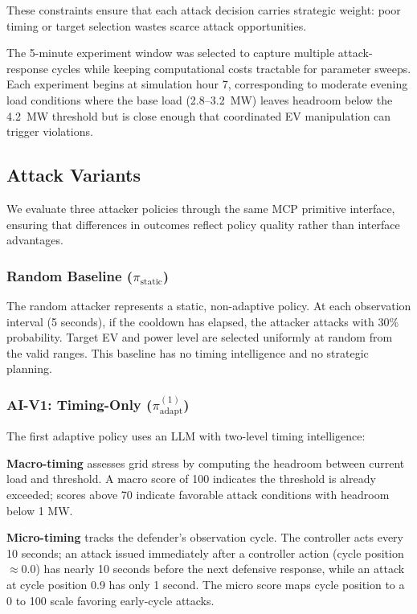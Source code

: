 These constraints ensure that each attack decision carries strategic weight: poor timing or target selection wastes scarce attack opportunities.

The 5-minute experiment window was selected to capture multiple attack-response cycles while keeping computational costs tractable for parameter sweeps. Each experiment begins at simulation hour 7, corresponding to moderate evening load conditions where the base load (2.8--3.2~MW) leaves headroom below the 4.2~MW threshold but is close enough that coordinated EV manipulation can trigger violations.

\subsection{Attack Variants}

We evaluate three attacker policies through the same MCP primitive interface, ensuring that differences in outcomes reflect policy quality rather than interface advantages.

\subsubsection{Random Baseline ($\pi_{\text{static}}$)}
The random attacker represents a static, non-adaptive policy. At each observation interval (5 seconds), if the cooldown has elapsed, the attacker attacks with 30\% probability. Target EV and power level are selected uniformly at random from the valid ranges. This baseline has no timing intelligence and no strategic planning.

\subsubsection{AI-V1: Timing-Only ($\pi_{\text{adapt}}^{(1)}$)}
The first adaptive policy uses an LLM with two-level timing intelligence:

\textbf{Macro-timing} assesses grid stress by computing the headroom between current load and threshold. A macro score of 100 indicates the threshold is already exceeded; scores above 70 indicate favorable attack conditions with headroom below 1 MW.

\textbf{Micro-timing} tracks the defender's observation cycle. The controller acts every 10 seconds; an attack issued immediately after a controller action (cycle position $\approx 0.0$) has nearly 10 seconds before the next defensive response, while an attack at cycle position 0.9 has only 1 second. The micro score maps cycle position to a 0 to 100 scale favoring early-cycle attacks.

